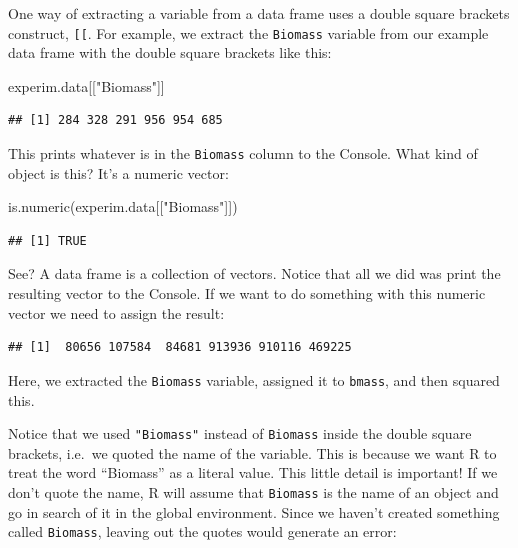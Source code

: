 \documentclass[
]{book}
\newenvironment{Shaded}{\begin{snugshade}}{\end{snugshade}}
\newcommand{\DecValTok}[1]{\textcolor[rgb]{0.00,0.00,0.81}{#1}}
\newcommand{\FunctionTok}[1]{\textcolor[rgb]{0.00,0.00,0.00}{#1}}
\newcommand{\NormalTok}[1]{#1}
\newcommand{\OtherTok}[1]{\textcolor[rgb]{0.56,0.35,0.01}{#1}}
\newcommand{\SpecialCharTok}[1]{\textcolor[rgb]{0.00,0.00,0.00}{#1}}
\newcommand{\StringTok}[1]{\textcolor[rgb]{0.31,0.60,0.02}{#1}}
\begin{document}
One way of extracting a variable from a data frame uses a double square brackets construct, \texttt{{[}{[}}. For example, we extract the \texttt{Biomass} variable from our example data frame with the double square brackets like this:

\begin{Shaded}
\begin{Highlighting}[]
\NormalTok{experim.data[[}\StringTok{"Biomass"}\NormalTok{]]}
\end{Highlighting}
\end{Shaded}

\begin{verbatim}
## [1] 284 328 291 956 954 685
\end{verbatim}

This prints whatever is in the \texttt{Biomass} column to the Console. What kind of object is this? It's a numeric vector:

\begin{Shaded}
\begin{Highlighting}[]
\FunctionTok{is.numeric}\NormalTok{(experim.data[[}\StringTok{"Biomass"}\NormalTok{]])}
\end{Highlighting}
\end{Shaded}

\begin{verbatim}
## [1] TRUE
\end{verbatim}

See? A data frame is a collection of vectors. Notice that all we did was print the resulting vector to the Console. If we want to do something with this numeric vector we need to assign the result:

\begin{Shaded}
\end{Shaded}

\begin{verbatim}
## [1]  80656 107584  84681 913936 910116 469225
\end{verbatim}

Here, we extracted the \texttt{Biomass} variable, assigned it to \texttt{bmass}, and then squared this.

Notice that we used \texttt{"Biomass"} instead of \texttt{Biomass} inside the double square brackets, i.e.~we quoted the name of the variable. This is because we want R to treat the word ``Biomass'' as a literal value. This little detail is important! If we don't quote the name, R will assume that \texttt{Biomass} is the name of an object and go in search of it in the global environment. Since we haven't created something called \texttt{Biomass}, leaving out the quotes would generate an error:
\end{document}
